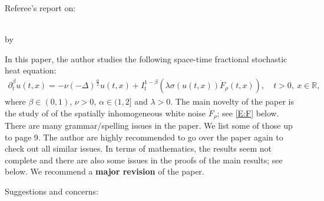 \documentclass[12pt]{article} %
\newcommand {\R}{\mathbb{R}}
\begin{document}

\begin{center}{
Referee's report on:\\[0.5em]
\begin{minipage}{0.8\textwidth}
\begin{center}
\end{center}
\end{minipage}
\\[0.5em]
by
\\[0.5em]
}
\end{center}

In this paper, the author studies the following space-time fractional
stochastic heat equation:
\begin{align*}
	\partial^\beta_t u(t,x) = -\nu (-\Delta)^{\frac{\alpha}{2}} u(t,x)
	+I_t^{1-\beta}\left(\lambda \sigma(u(t,x)) \dot{F}_\rho(t,x)\right),
	\quad t>0,\: x\in\R,
\end{align*}
where $\beta\in (0,1)$, $\nu>0$, $\alpha\in(1,2]$ and $\lambda>0$. The main
novelty of the paper is the study of of the spatially inhomogeneous white noise
$\dot{F}_\rho$; see \eqref{E:F} below. There are many grammar/spelling issues
in the paper. We list some of those up to page 9. The author are highly
recommended to go over the paper again to check out all similar issues. In
terms of mathematics, the results seem not complete and there are also some
issues in the proofs of the main results; see below. We recommend a {\bf major
revision} of the paper.


Suggestions and concerns:
\end{document}
